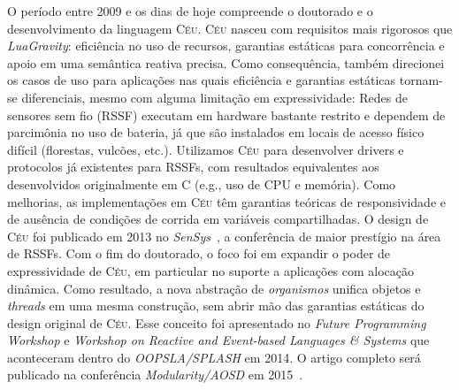 \documentclass[12pt,a4paper]{article}
\newcommand{\CEU}{\textsc{C\'{e}u}\xspace}
\newcommand{\GVT}{\emph{LuaGravity}\xspace}
\begin{document}
O período entre 2009 e os dias de hoje compreende o doutorado e o 
desenvolvimento da linguagem \CEU.
%
%
%
%
\CEU nasceu com requisitos mais rigorosos que \GVT: eficiência no uso de 
recursos, garantias estáticas para concorrência e apoio em uma semântica 
reativa precisa.
%
Como consequência, também direcionei os casos de uso para aplicações nas quais
eficiência e garantias estáticas tornam-se diferenciais, mesmo com alguma 
limitação em expressividade:
Redes de sensores sem fio (RSSF) executam em hardware bastante restrito e 
dependem de parcimônia no uso de bateria, já que são instalados em locais de 
acesso físico difícil (florestas, vulcões, etc.).
%
Utilizamos \CEU para desenvolver drivers e protocolos já existentes para RSSFs, 
com resultados equivalentes aos desenvolvidos originalmente em C (e.g., uso de 
CPU e memória).
Como melhorias, as implementações em \CEU têm garantias teóricas de 
responsividade e de ausência de condições de corrida em variáveis 
compartilhadas.
%
O design de \CEU foi publicado em 2013 no \emph{SenSys}~\cite{ceu.sensys13}, a 
conferência de maior prestígio na área de RSSFs.
%
Com o fim do doutorado, o foco foi em expandir o poder de expressividade de 
\CEU, em particular no suporte a aplicações com alocação dinâmica.
Como resultado, a nova abstração de \emph{organismos} unifica objetos e 
\emph{threads} em uma mesma construção, sem abrir mão das garantias estáticas 
do design original de \CEU.
%
Esse conceito foi apresentado no \emph{Future Programming Workshop} e 
\emph{Workshop on Reactive and Event-based Languages \& Systems} que 
aconteceram dentro do \emph{OOPSLA/SPLASH} em 2014.
O artigo completo será publicado na conferência \emph{Modularity/AOSD} em 
2015~\cite{ceu.mod15}.
\end{document}

